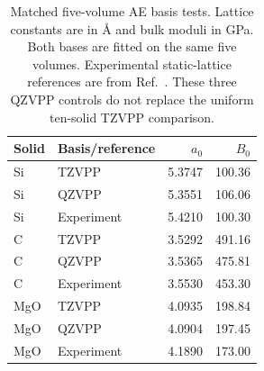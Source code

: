 \begin{table}[htbp]
\centering\small
\caption{Matched five-volume AE basis tests. Lattice constants are in \AA{} and bulk moduli in GPa. Both bases are fitted on the same five volumes. Experimental static-lattice references are from Ref.~. These three QZVPP controls do not replace the uniform ten-solid TZVPP comparison.}
\label{tab:solid-basis}
\begin{tabular}{llrr}
\toprule
Solid & Basis/reference & $a_0$ & $B_0$\\
\midrule
Si & TZVPP & 5.3747 & 100.36\\
Si & QZVPP & 5.3551 & 106.06\\
Si & Experiment & 5.4210 & 100.30\\
C & TZVPP & 3.5292 & 491.16\\
C & QZVPP & 3.5365 & 475.81\\
C & Experiment & 3.5530 & 453.30\\
MgO & TZVPP & 4.0935 & 198.84\\
MgO & QZVPP & 4.0904 & 197.45\\
MgO & Experiment & 4.1890 & 173.00\\
\bottomrule
\end{tabular}
\end{table}
